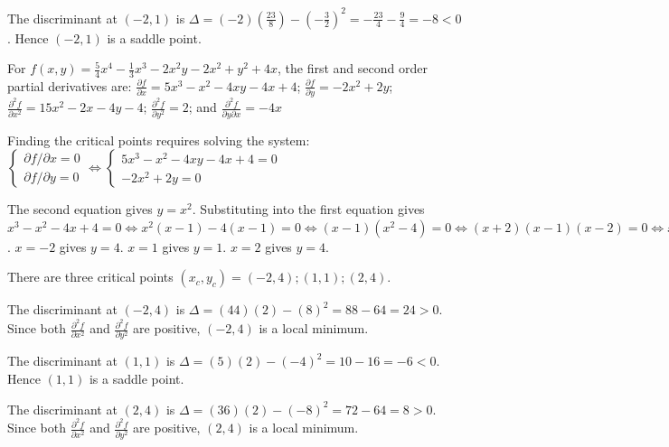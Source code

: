\documentclass{article}
\newcommand{\partdiff}[2]{\frac{\partial #1}{\partial #2}}
\newcommand{\dr}[1]{\textcolor{dark_red}{#1}}
\begin{document}
\dr{The discriminant at \((-2,1)\) is \(\Delta = (-2)(\frac{23}{8}) - (-\frac{3}{2})^2 = -\frac{23}{4} - \frac{9}{4} = -8 < 0\). Hence \((-2,1)\) is a saddle point.}

\vspace{1cm}

\dr{For \(f(x,y) = \frac{5}{4}x^4 - \frac{1}{3}x^3 - 2x^2y - 2x^2 + y^2 + 4x\), the first and second order partial derivatives are: 
\(\partdiff{f}{x} = 5x^3 - x^2 - 4xy - 4x + 4\); \(\partdiff{f}{y} = -2x^2 + 2y\); \(\frac{\partial^2 f}{\partial x^2} = 15x^2 - 2x - 4y - 4\); \(\frac{\partial^2 f}{\partial y^2} = 2\); and \(\frac{\partial^2 f}{\partial y \partial x} = -4x\)}

\dr{Finding the critical points requires solving the system: \(\left\{\begin{array}{c} \partial f/\partial x = 0 \\ \partial f/\partial y = 0 \end{array}\right. \iff \left\{\begin{array}{c} 5x^3 - x^2 - 4xy - 4x + 4 = 0 \\ -2x^2 + 2y = 0 \end{array}\right.\)}

\dr{The second equation gives \(y = x^2\). Substituting into the first equation gives \\ \(x^3 - x^2 - 4x + 4 = 0 \iff x^2(x-1) - 4(x-1) = 0 \iff (x-1)(x^2-4) = 0 \iff (x+2)(x-1)(x-2) = 0 \iff x = -2,1,2\). \(x = -2\) gives \(y = 4\). \(x = 1\) gives \(y = 1\). \(x = 2\) gives \(y = 4\).}

\dr{There are three critical points \((x_c, y_c) = (-2,4); (1,1); (2,4)\).}

\dr{The discriminant at \((-2,4)\) is \(\Delta = (44)(2) - (8)^2 = 88 - 64 = 24 > 0\). Since both \(\frac{\partial^2 f}{\partial x^2}\) and \(\frac{\partial^2 f}{\partial y^2}\) are positive, \((-2,4)\) is a local minimum.}

\dr{The discriminant at \((1,1)\) is \(\Delta = (5)(2) - (-4)^2 = 10 - 16 = -6 < 0\). Hence \((1,1)\) is a saddle point.}

\dr{The discriminant at \((2,4)\) is \(\Delta = (36)(2) - (-8)^2 = 72 - 64 = 8 > 0\). Since both \(\frac{\partial^2 f}{\partial x^2}\) and \(\frac{\partial^2 f}{\partial y^2}\) are positive, \((2,4)\) is a local minimum.}
\end{document}
